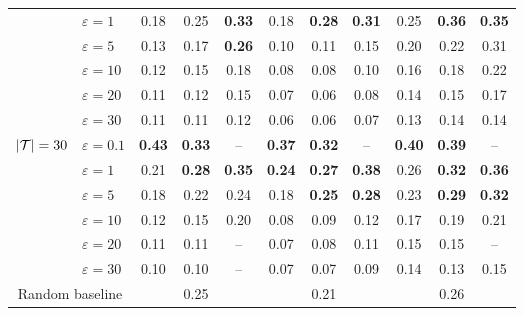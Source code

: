 \begin{table*}[htb]
{\begin{tabular}{llccccccccc}
                                & $\varepsilon = 1$   & 0.18    & 0.25   & \textbf{0.33}   & 0.18    & \textbf{0.28}    & \textbf{0.31}   & 0.25       & \textbf{0.36}       & \textbf{0.35}      \\
                                & $\varepsilon = 5$   & 0.13    & 0.17   & \textbf{0.26}   & 0.10    & 0.11    & 0.15   & 0.20       & 0.22       & 0.31      \\
                                & $\varepsilon = 10$  & 0.12    & 0.15   & 0.18   & 0.08    & 0.08    & 0.10   & 0.16       & 0.18       & 0.22      \\
                                & $\varepsilon = 20$  & 0.11    & 0.12   & 0.15   & 0.07    & 0.06    & 0.08   & 0.14       & 0.15       & 0.17      \\
                                & $\varepsilon = 30$  & 0.11    & 0.11   & 0.12   & 0.06    & 0.06    & 0.07   & 0.13       & 0.14       & 0.14      \\
\midrule
\multirow{6}{*}{$\vert \mathcal{T} \rvert = 30$} & $\varepsilon = 0.1$ & \textbf{0.43}    & \textbf{0.33}   & --   & \textbf{0.37}    & \textbf{0.32}    & --   & \textbf{0.40}       & \textbf{0.39}       & --      \\
                                & $\varepsilon = 1$   & 0.21    & \textbf{0.28}   &\textbf{ 0.35 }  & \textbf{0.24}    & \textbf{0.27}    & \textbf{0.38}   & 0.26       & \textbf{0.32}       & \textbf{0.36}      \\
                                & $\varepsilon = 5$   & 0.18    & 0.22   & 0.24   & 0.18    & \textbf{0.25}    & \textbf{0.28}   & 0.23       & \textbf{0.29}       & \textbf{0.32}      \\
                                & $\varepsilon = 10$  & 0.12    & 0.15   & 0.20   & 0.08    & 0.09    & 0.12   & 0.17       & 0.19       & 0.21      \\
                                & $\varepsilon = 20$  & 0.11    & 0.11   & --   & 0.07    & 0.08    & 0.11   & 0.15       & 0.15       & --      \\
                                & $\varepsilon = 30$  & 0.10    & 0.10   & --   & 0.07    & 0.07    & 0.09   & 0.14       & 0.13       & 0.15      \\
\midrule
\multicolumn{2}{c}{Random baseline}                   & \multicolumn{3}{c}{0.25}  & \multicolumn{3}{c}{0.21}   & \multicolumn{3}{c}{0.26}   \\        
\bottomrule
\end{tabular}%
}
\end{table*}